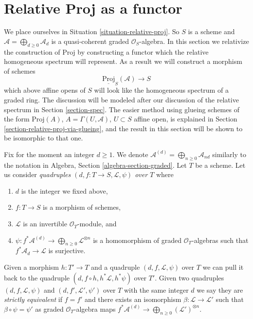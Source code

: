 \section{Relative Proj as a functor}
\label{section-relative-proj}

\noindent
We place ourselves in Situation \ref{situation-relative-proj}.
So $S$ is a scheme and $\mathcal{A} = \bigoplus_{d \geq 0} \mathcal{A}_d$
is a quasi-coherent graded $\mathcal{O}_S$-algebra.
In this section we relativize the construction of
$\text{Proj}$ by constructing a functor which the relative
homogeneous spectrum will represent.
As a result we will construct a morphism of schemes
$$
\underline{\text{Proj}}_S(\mathcal{A}) \longrightarrow S
$$
which above affine opens of $S$ will look like the homogeneous spectrum
of a graded ring. The discussion will be modeled after our
discussion of the relative spectrum in Section \ref{section-spec}.
The easier method using glueing schemes of the form
$\text{Proj}(A)$, $A = \Gamma(U, \mathcal{A})$, $U \subset S$
affine open, is explained in Section \ref{section-relative-proj-via-glueing},
and the result in this section will be shown to be isomorphic to that one.

\medskip\noindent
Fix for the moment an integer $d \geq 1$.
We denote $\mathcal{A}^{(d)} = \bigoplus_{n \geq 0} \mathcal{A}_{nd}$
similarly to the notation in Algebra, Section \ref{algebra-section-graded}.
Let $T$ be a scheme.
Let us consider {\it quadruples $(d, f : T \to S, \mathcal{L}, \psi)$
over $T$} where
\begin{enumerate}
\item $d$ is the integer we fixed above,
\item $f : T \to S$ is a morphism of schemes,
\item $\mathcal{L}$ is an invertible $\mathcal{O}_T$-module, and
\item
$\psi : f^*\mathcal{A}^{(d)} \to \bigoplus_{n \geq 0}\mathcal{L}^{\otimes n}$
is a homomorphism of graded $\mathcal{O}_T$-algebras
such that $f^*\mathcal{A}_d \to \mathcal{L}$ is surjective.
\end{enumerate}
Given a morphism $h : T' \to T$ and a quadruple
$(d, f, \mathcal{L}, \psi)$ over $T$ we can pull it back to the
quadruple $(d, f \circ h, h^*\mathcal{L}, h^*\psi)$ over $T'$.
Given two quadruples $(d, f, \mathcal{L}, \psi)$ and
$(d, f', \mathcal{L}', \psi')$ over $T$ with the same integer $d$
we say they are {\it strictly equivalent} if $f = f'$ and there exists
an isomorphism $\beta : \mathcal{L} \to \mathcal{L}'$
such that $\beta \circ \psi = \psi'$ as graded $\mathcal{O}_T$-algebra maps
$f^*\mathcal{A}^{(d)} \to \bigoplus_{n \geq 0} (\mathcal{L}')^{\otimes n}$.


